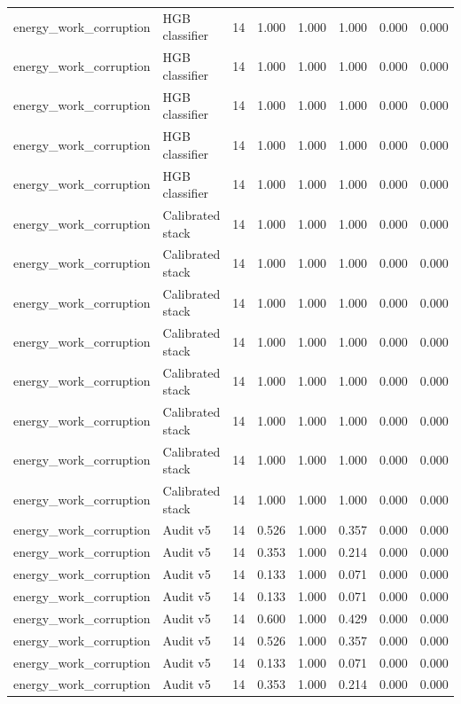 {\begin{longtable}{llrrrrrr}
energy\_work\_corruption & HGB classifier & 14 & 1.000 & 1.000 & 1.000 & 0.000 & 0.000 \\
energy\_work\_corruption & HGB classifier & 14 & 1.000 & 1.000 & 1.000 & 0.000 & 0.000 \\
energy\_work\_corruption & HGB classifier & 14 & 1.000 & 1.000 & 1.000 & 0.000 & 0.000 \\
energy\_work\_corruption & HGB classifier & 14 & 1.000 & 1.000 & 1.000 & 0.000 & 0.000 \\
energy\_work\_corruption & HGB classifier & 14 & 1.000 & 1.000 & 1.000 & 0.000 & 0.000 \\
energy\_work\_corruption & Calibrated stack & 14 & 1.000 & 1.000 & 1.000 & 0.000 & 0.000 \\
energy\_work\_corruption & Calibrated stack & 14 & 1.000 & 1.000 & 1.000 & 0.000 & 0.000 \\
energy\_work\_corruption & Calibrated stack & 14 & 1.000 & 1.000 & 1.000 & 0.000 & 0.000 \\
energy\_work\_corruption & Calibrated stack & 14 & 1.000 & 1.000 & 1.000 & 0.000 & 0.000 \\
energy\_work\_corruption & Calibrated stack & 14 & 1.000 & 1.000 & 1.000 & 0.000 & 0.000 \\
energy\_work\_corruption & Calibrated stack & 14 & 1.000 & 1.000 & 1.000 & 0.000 & 0.000 \\
energy\_work\_corruption & Calibrated stack & 14 & 1.000 & 1.000 & 1.000 & 0.000 & 0.000 \\
energy\_work\_corruption & Calibrated stack & 14 & 1.000 & 1.000 & 1.000 & 0.000 & 0.000 \\
energy\_work\_corruption & Audit v5 & 14 & 0.526 & 1.000 & 0.357 & 0.000 & 0.000 \\
energy\_work\_corruption & Audit v5 & 14 & 0.353 & 1.000 & 0.214 & 0.000 & 0.000 \\
energy\_work\_corruption & Audit v5 & 14 & 0.133 & 1.000 & 0.071 & 0.000 & 0.000 \\
energy\_work\_corruption & Audit v5 & 14 & 0.133 & 1.000 & 0.071 & 0.000 & 0.000 \\
energy\_work\_corruption & Audit v5 & 14 & 0.600 & 1.000 & 0.429 & 0.000 & 0.000 \\
energy\_work\_corruption & Audit v5 & 14 & 0.526 & 1.000 & 0.357 & 0.000 & 0.000 \\
energy\_work\_corruption & Audit v5 & 14 & 0.133 & 1.000 & 0.071 & 0.000 & 0.000 \\
energy\_work\_corruption & Audit v5 & 14 & 0.353 & 1.000 & 0.214 & 0.000 & 0.000 \\

\end{longtable}}

